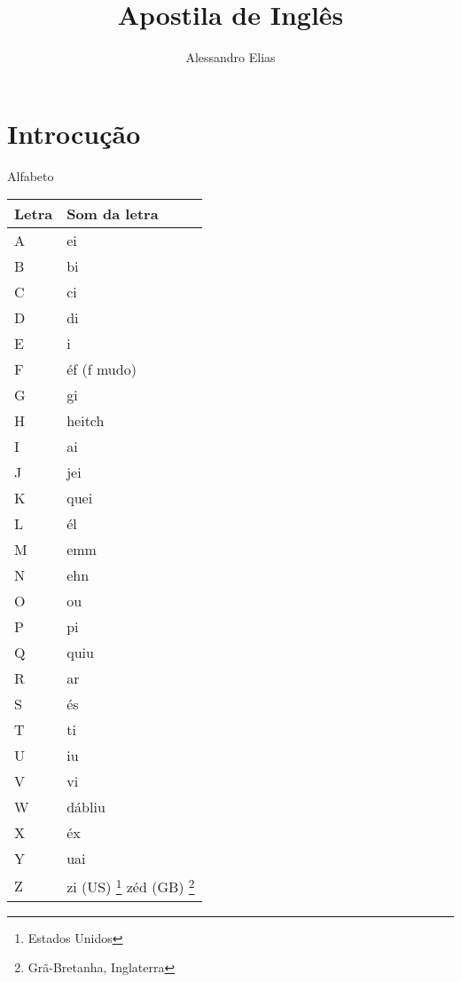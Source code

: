 \documentclass{book}
\begin{document}
\tableofcontents
 
\vspace{2cm} %

\title{Apostila de Inglês} \author{Alessandro Elias}
\section{Introcução}
Alfabeto

\begin{center}
  \begin{tabular}{ |p{1cm}|p{5cm}| }
    \hline
    Letra& Som da letra \\ 
    \hline
    A& ei \\ 
    \hline
    B& bi \\
    \hline
    C& ci \\
    \hline
    D& di \\
    \hline
    E& i \\
    \hline
    F& éf (f mudo) \\
    \hline
    G& gi \\
    \hline
    H& heitch\\
    \hline
    I& ai \\
    \hline
    J& jei \\
    \hline
    K& quei \\
    \hline
    L& él \\
    \hline
    M& emm \\
    \hline
    N& ehn \\
    \hline
    O& ou \\
    \hline
    P& pi \\
    \hline
    Q& quiu \\
    \hline
    R& ar \\
    \hline
    S& és \\
    \hline
    T& ti \\
    \hline
    U& iu \\
    \hline
    V& vi \\
    \hline
    W& dábliu \\
    \hline
    X& éx \\
    \hline
    Y& uai \\
    \hline
    Z& zi (US) \footnote{Estados Unidos} zéd (GB) \footnote{Grã-Bretanha, Inglaterra} \\
    \hline
  \end{tabular}
\end{center}
\end{document}
